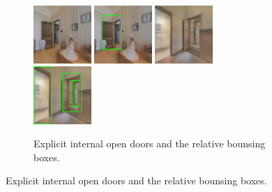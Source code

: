 \begin{figure}[h!]
	\begin{subfigure}[b]{\linewidth}
		\centering
		\includegraphics[width=0.24\textwidth]{images/explicitinternalopen1.png}
		\hfill
		\includegraphics[width=0.24\textwidth]{images/explicitinternalopen1boxed.png}
		\hfill
		\includegraphics[width=0.24\textwidth]{images/explicitinternalopen2.png}
		\hfill
		\includegraphics[width=0.24\textwidth]{images/explicitinternalopen2boxed.png}
		\caption{Explicit internal open doors and the relative bounsing boxes.}
	\end{subfigure}


\end{figure}
